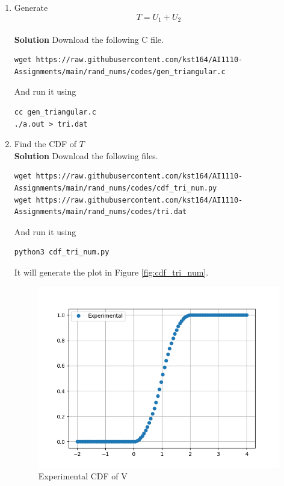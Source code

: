 \documentclass[journal, 12pt, twocolumn]{IEEEtran}
\begin{document}
\begin{enumerate}[label=\arabic{section}.\arabic*]
    \item
        Generate
        \begin{equation}
            T = U_1 + U_2
        \end{equation}
        \\
        \textbf{Solution} Download the following C file.
        \begin{lstlisting}
wget https://raw.githubusercontent.com/kst164/AI1110-Assignments/main/rand_nums/codes/gen_triangular.c
        \end{lstlisting}
        And run it using
        \begin{lstlisting}
cc gen_triangular.c
./a.out > tri.dat
        \end{lstlisting}

    \item
        Find the CDF of $T$
        \\
        \textbf{Solution} Download the following files.
        \begin{lstlisting}
wget https://raw.githubusercontent.com/kst164/AI1110-Assignments/main/rand_nums/codes/cdf_tri_num.py
wget https://raw.githubusercontent.com/kst164/AI1110-Assignments/main/rand_nums/codes/tri.dat
        \end{lstlisting}
        And run it using
        \begin{lstlisting}
python3 cdf_tri_num.py
        \end{lstlisting}
        It will generate the plot in Figure \eqref{fig:cdf_tri_num}.
        \begin{figure}[!ht]
            \includegraphics[width=\columnwidth]{figs/cdf_tri_num.png}
            \caption{Experimental CDF of V}
            \label{fig:cdf_tri_num}
        \end{figure}


\end{enumerate}
\end{document}
